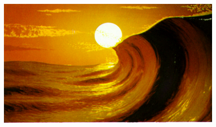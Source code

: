\begin{figure}
{ }
 \hfill
 \subtop
 {
  \includegraphics[scale=0.25]{figures/A_Simple_Model_of_Ocean_Waves_-_Fournier_1986-013.png}
 }
\end{figure}